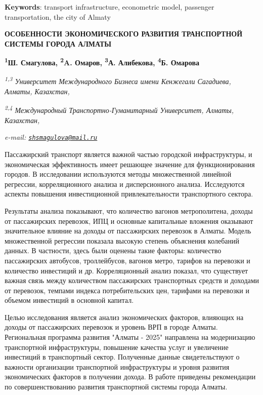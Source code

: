 {\bfseries Keywords}: transport infrastructure, econometric model,
passenger transportation, the city of Almaty

\begin{articleheader}
{\bfseries ОСОБЕННОСТИ ЭКОНОМИЧЕСКОГО РАЗВИТИЯ ТРАНСПОРТНОЙ СИСТЕМЫ ГОРОДА АЛМАТЫ}

{\bfseries  
\textsuperscript{1}Ш. Смагулова\textsuperscript{\envelope },
\textsuperscript{2}A. Омаров,
\textsuperscript{3}А. Алибекова,
\textsuperscript{4}Б. Омарова}
\end{articleheader}

\begin{affiliation}
\emph{\textsuperscript{1,3} Университет Международного Бизнеса имени Кенжегали Сагадиева, Алматы, Казахстан,}

\emph{\textsuperscript{2,4} Международный Транспортно-Гуманитарный Университет, Алматы, Казахстан,}

\emph{e-mail: \href{mailto:shsmagulova@mail.ru}{\nolinkurl{shsmagulova@mail.ru}}}
\end{affiliation}

Пассажирский транспорт является важной частью городской инфраструктуры,
и экономическая эффективность имеет решающее значение для
функционирования городов. В исследовании используются методы
множественной линейной регрессии, корреляционного анализа и
дисперсионного анализа. Исследуются аспекты повышения инвестиционной
привлекательности транспортного сектора.

Результаты анализа показывают, что количество вагонов метрополитена,
доходы от пассажирских перевозок, ИПЦ и основные капитальные вложения
оказывают значительное влияние на доходы от пассажирских перевозок в
Алматы. Модель множественной регрессии показала высокую степень
объяснения колебаний данных. В частности, здесь были оценены такие
факторы: количество пассажирских автобусов, троллейбусов, вагонов метро,
тарифов на перевозки и количество инвестиций и др. Корреляционный анализ
показал, что существует важная связь между количеством пассажирских
транспортных средств и доходами от перевозок, темпами индекса
потребительских цен, тарифами на перевозки и объемом инвестиций в
основной капитал.

Целью исследования является анализ экономических факторов, влияющих на
доходы от пассажирских перевозок и уровень ВРП в городе Алматы.
Региональная программа развития "Алматы - 2025" направлена на
модернизацию транспортной инфраструктуры, повышение качества услуг и
увеличение инвестиций в транспортный сектор. Полученные данные
свидетельствуют о важности организации транспортной инфраструктуры и
уровня развития экономических факторов в получении дохода. В работе
приведены рекомендации по совершенствованию развития транспортной
системы города Алматы.

